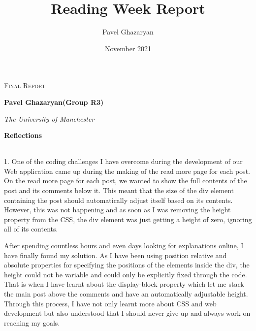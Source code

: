 \documentclass{article}
\title{Reading Week Report}
\author{Pavel Ghazaryan}
\date{November 2021}
\begin{document}
\begin{titlepage}
    \begin{center}

            \vspace*{1cm}
            \Huge
            \textsc{Final Report}
            
            \vspace{0.5cm}
            \Large
            
            \vspace{1.5cm}
        
            \textbf{Pavel Ghazaryan(Group R3)}
            
            \vspace{1.5cm}
            \it{The University of Manchester}
        
            \vfill
                    
                
             
    \end{center}
\end{titlepage}
\newpage
\newpage
\Large
\textbf{Reflections}\\\


1.	One of the coding challenges I have overcome during the development of our Web application came up during the making of the read more page for each post. On the read more page for each post, we wanted to show the full contents of the post and its comments below it. This meant that the size of the div element containing the post should automatically adjust itself based on its contents. However, this was not happening and as soon as I was removing the height property from the CSS, the div element was just getting a height of zero, ignoring all of its contents.

\setlength{\parindent}{20pt} After spending countless hours and even days looking for explanations online, I have finally found my solution. As I have been using position relative and absolute properties for specifying the positions of the elements inside the div, the height could not be variable and could only be explicitly fixed through the code. That is when I have learnt about the display-block property which let me stack the main post above the comments and have an automatically adjustable height. Through this process, I have not only learnt more about CSS and web development but also understood that I should never give up and always work on reaching my goals. \\\\
\end{document}
